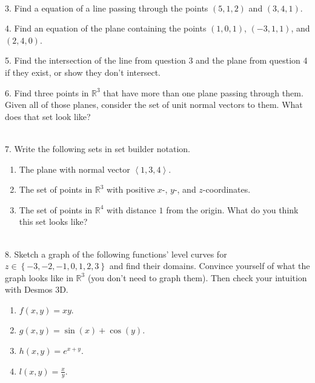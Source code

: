 \documentclass{article}
\begin{document}
~\\

3. Find a equation of a line passing through the points $(5, 1, 2)$ and $(3, 4, 1)$.

4. Find an equation of the plane containing the points $(1, 0, 1)$, $(-3, 1, 1)$, and $(2, 4, 0)$.

5. Find the intersection of the line from question 3 and the plane from question 4 if they exist, or show they don't intersect.

6. Find three points in $\mathbb{R}^3$ that have more than one plane passing through them. Given all of those planes, consider the set of unit normal vectors to them. What does that set look like?

~\\

7. Write the following sets in set builder notation.

\begin{enumerate}

	\item The plane with normal vector $\left< 1, 3, 4 \right>$.

	\item The set of points in $\mathbb{R}^3$ with positive $x$-, $y$-, and $z$-coordinates.

	\item The set of points in $\mathbb{R}^4$ with distance $1$ from the origin. What do you think this set looks like?

\end{enumerate}

~\\

8. Sketch a graph of the following functions' level curves for $z \in \left\{ -3, -2, -1, 0, 1, 2, 3 \right\}$ and find their domains. Convince yourself of what the graph looks like in $\mathbb{R}^3$ (you don't need to graph them). Then check your intuition with Desmos 3D.

\begin{enumerate}

	\item $f(x, y) = xy$.

	\item $g(x, y) = \sin(x) + \cos(y)$.

	\item $h(x, y) = e^{x + y}$.

	\item $l(x, y) = \frac{x}{y}$.

\end{enumerate}
\end{document}
